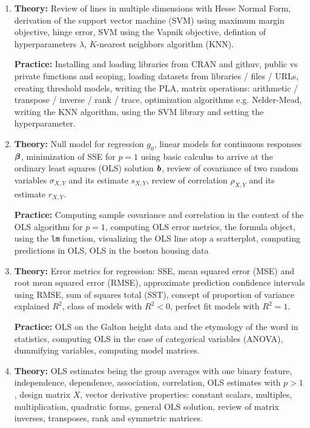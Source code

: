 \documentclass[12pt]{article}
\begin{document}
\begin{enumerate}[(1)]
\item \textbf{Theory:} Review of lines in multiple dimensions with Hesse Normal Form, derivation of the support vector machine (SVM) using maximum margin objective, hinge error, SVM using the Vapnik objective, defintion of hyperparameters $\lambda$, $K$-nearest neighbors algorithm (KNN).

\textbf{Practice:} Installing and loading libraries from CRAN and githuv, public vs private functions and scoping, loading datasets from libraries / files / URLs, creating threshold models, writing the PLA, matrix operations: arithmetic / transpose / inverse / rank / trace, optimization algorithms e.g. Nelder-Mead, writing the KNN algorithm, using the SVM library and setting the hyperparameter.

\item \textbf{Theory:} Null model for regression $g_0$, linear models for continuous responses $\boldsymbol{\beta}$, minimization of SSE for $p=1$ using basic calculus to arrive at the ordinary least squares (OLS) solution $\boldsymbol{b}$, review of covariance of two random variables $\sigma_{X,Y}$ and its estimate $s_{X,Y}$, review of correlation $\rho_{X,Y}$ and its estimate $r_{X,Y}$.

\textbf{Practice:} Computing sample covariance and correlation in the context of the OLS algorithm for $p=1$, computing OLS error metrics, the formula object, using the \texttt{lm} function, visualizing the OLS line atop a scatterplot, computing predictions in OLS, OLS in the boston housing data

\item \textbf{Theory:} Error metrics for regression: SSE, mean squared error (MSE) and root mean squared error (RMSE), approximate prediction confidence intervals using RMSE, sum of squares total (SST), concept of proportion of variance explained $R^2$, class of models with $R^2 < 0$, perfect fit models with $R^2 = 1$.

\textbf{Practice:} OLS on the Galton height data and the etymology of the word  in statistics, computing OLS in the case of categorical variables (ANOVA), dummifying variables, computing model matrices.

\item \textbf{Theory:} OLS estimates being the group averages with one binary feature, independence, dependence, association, correlation, OLS estimates with $p>1$, design matrix $X$, vector derivative properties: constant scalars, multiples, multiplication, quadratic forms, general OLS solution, review of matrix inverses, transposes, rank and symmetric matrices.


\end{enumerate}
\end{document}
